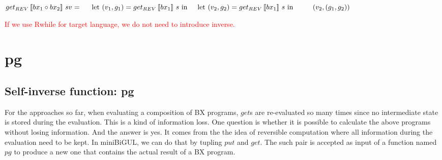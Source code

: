 \documentclass[runningheads]{llncs}
\newcommand{\tab}{\hspace*{5mm}}
\newcommand{\qtab}{\hspace*{5mm} \ \quad}
\newcommand{\getrev}[2]{get_{REV} \, [\![#1]\!] \ {#2}}
\begin{document}
$\getrev{bx_1 \circ bx_2}{s}{v} =\\
    \tab \text{let} \ (v_1, g_1) = \getrev{bx_1}{s} \ \text{in}\\
    \tab \text{let} \ (v_2, g_2) = \getrev{bx_1}{s} \ \text{in}\\
        \qtab (v_2, (g_1, g_2))$

\textcolor{red}{If we use Rwhile for target language, we do not need to introduce inverse.}

\section{pg}
\subsection{Self-inverse function: pg}


For the approaches so far, when evaluating a composition of BX programs, $get$s are re-evaluated so many times since no intermediate state is stored during the evaluation. This is a kind of information loss. One question is whether it is possible to calculate the above programs without losing information. And the answer is yes. It comes from the the idea of reversible computation where all information during the evaluation need to be kept. In miniBiGUL, we can do that by tupling $put$ and $get$. The such pair is accepted as input of a function named $pg$ to produce a new one that contains the actual result of a BX program.
\end{document}
